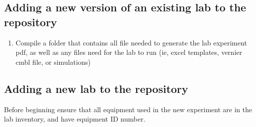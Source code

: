 \documentclass[justified]{book}
\begin{document}

\subsection{Adding a new version of an existing lab to the repository}

\begin{enumerate}
\item Compile a folder that contains all file needed to generate the lab experiment pdf, as well as any files need for the lab to run (ie, excel templates, vernier cmbl file, or simulations)
\end{enumerate}

\subsection{Adding a new lab to the repository}

Before beginning ensure that all equipment used in the new experiment are in the lab inventory, and have equipment ID number. 
\end{document}
